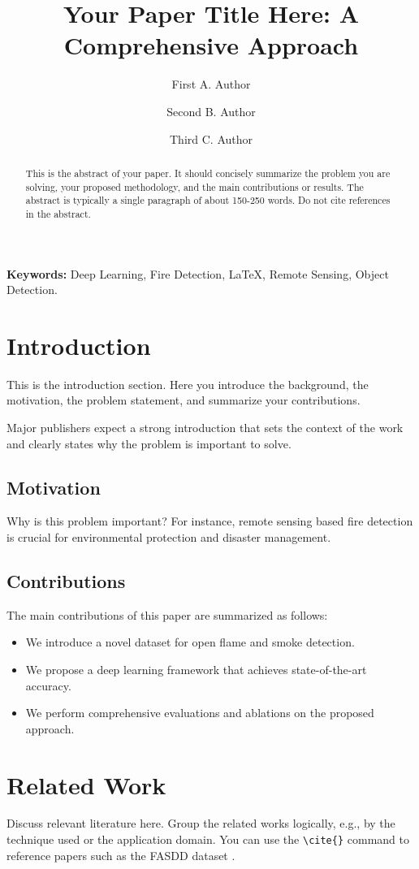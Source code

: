 \documentclass[10pt, twocolumn, a4paper]{article}
\title{Your Paper Title Here: A Comprehensive Approach}
\author[1]{First A. Author}
\author[2]{Second B. Author}
\author[2]{Third C. Author}
\affil[1]{Example Institute, City, State ZIP (e-mail: author@example.com)}
\affil[2]{Department of Computer Science, Example University, City, State ZIP}
\date{} %
\begin{document}
\maketitle

\begin{abstract}
This is the abstract of your paper. It should concisely summarize the problem you are solving, your proposed methodology, and the main contributions or results. The abstract is typically a single paragraph of about 150-250 words. Do not cite references in the abstract.
\end{abstract}

\vspace{1em}
\noindent\textbf{Keywords:} Deep Learning, Fire Detection, \LaTeX, Remote Sensing, Object Detection.
\vspace{1em}

\section{Introduction}
This is the introduction section. Here you introduce the background, the motivation, the problem statement, and summarize your contributions. 

Major publishers expect a strong introduction that sets the context of the work and clearly states why the problem is important to solve. 

\subsection{Motivation}
Why is this problem important? For instance, remote sensing based fire detection is crucial for environmental protection and disaster management.

\subsection{Contributions}
The main contributions of this paper are summarized as follows:
\begin{itemize}
    \item We introduce a novel dataset for open flame and smoke detection.
    \item We propose a deep learning framework that achieves state-of-the-art accuracy.
    \item We perform comprehensive evaluations and ablations on the proposed approach.
\end{itemize}

\section{Related Work}
Discuss relevant literature here. Group the related works logically, e.g., by the technique used or the application domain. You can use the \verb|\cite{}| command to reference papers such as the FASDD dataset \cite{example_dataset_2026}. 
\end{document}
